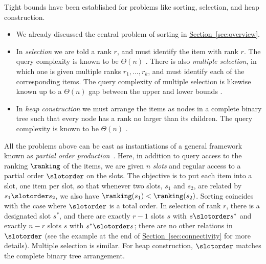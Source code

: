 \documentclass[11pt]{article}
\numberwithin{equation}{section}
\theoremstyle{definition}
\theoremstyle{plain}
\newcommand{\expref}[2]{\hyperref[#2]{#1~\ref{#2}}}
\begin{document}
Tight bounds have been established for problems like sorting, selection, and heap construction. 
\begin{itemize}
 \item We already discussed the central problem of sorting in \expref{Section}{sec:overview}.
 \item In \emph{selection} we are told a rank $r$, and must identify the item with rank $r$. The query complexity is known to be $\Theta(n)$ \cite{BFPRT1973,DorZwick1995,DorZwick1996}. There is also \emph{multiple selection}, in which one is given multiple ranks $r_1,\dots,r_k$, and must identify each of the corresponding items. 
 The query complexity of multiple selection is likewise known up to a $\Theta(n)$ gap between the upper and lower bounds \cite{KMMS2005}.
 \item In \emph{heap construction} we must arrange the items as nodes in a complete binary tree such that every node has a rank no larger than its children. The query complexity is known to be $\Theta(n)$ \cite{CC92,GM86}. 
\end{itemize}

All the problems above can be cast as instantiations of a general framework known as \emph{partial order production}~\cite{Schoenhage1976}. Here, in addition to query access to the ranking $\ranking$ of the items, we are given $n$ \emph{slots} and regular access to a partial order $\slotorder$ on the slots. The objective is to put each item into a slot, one item per slot, so that whenever two slots, $s_1$ and $s_2$, are related by $s_1 \slotorder s_2$, we also have $\ranking(s_1) < \ranking(s_2)$. Sorting coincides with the case where $\slotorder$ is a total order. In selection of rank $r$, there is a designated slot $s^*$, and there are exactly $r-1$ slots $s$ with $s \slotorder s^*$ and exactly $n-r$ slots $s$ with $s^* \slotorder s$; there are no other relations in $\slotorder$ (see the example at the end of \expref{Section}{sec:connectivity} for more details).  Multiple selection is similar. For heap construction, $\slotorder$ matches the complete binary tree arrangement. 
\end{document}
